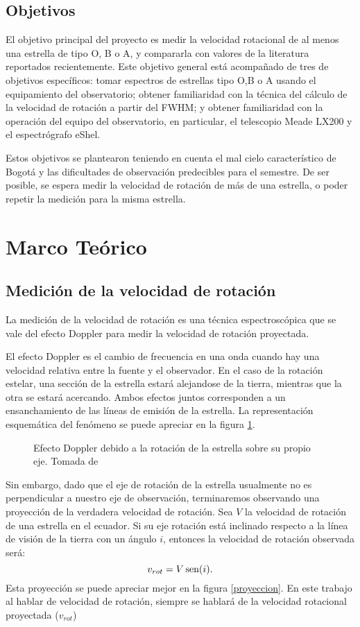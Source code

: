 \documentclass[notitlepage,letterpaper,12pt]{article} %
\def\sen{\mathop{\mbox{\normalfont sen}}\nolimits} %
\begin{document}
\subsection*{Objetivos}
El objetivo principal del proyecto es medir la velocidad rotacional de al menos una estrella de tipo O, B o A, y compararla con valores de la literatura reportados recientemente.
Este objetivo general está acompañado de tres de objetivos específicos: tomar espectros de estrellas tipo O,B o A usando el equipamiento del observatorio; obtener familiaridad con la técnica del cálculo de la velocidad de rotación a partir del FWHM; y obtener familiaridad con la operación del equipo del observatorio, en particular, el telescopio Meade LX200 y el espectrógrafo eShel.

Estos objetivos se plantearon teniendo en cuenta el mal cielo característico de Bogotá y las dificultades de observación predecibles para el semestre. De ser posible, se espera medir la velocidad de rotación de más de una estrella, o poder repetir la medición para la misma estrella.

\section{Marco Teórico}
\subsection*{Medición de la velocidad de rotación}
La medición de la velocidad de rotación es una técnica espectroscópica que se vale del efecto Doppler para medir la velocidad de rotación proyectada.

El efecto Doppler es el cambio de frecuencia en una onda cuando hay una velocidad relativa entre la fuente y el observador. En el caso de la rotación estelar, una sección de la estrella estará alejandose de la tierra, mientras que la otra se estará acercando. Ambos efectos juntos corresponden a un ensanchamiento de las líneas de emisión de la estrella.
La representación esquemática del fenómeno se puede apreciar en la figura \ref{doppler}.

\begin{figure}[h!]
  \centering
  \caption{Efecto Doppler debido a la rotación de la estrella sobre su propio eje. Tomada de \cite{doppler} }
  \label{doppler}
\end{figure}

Sin embargo, dado que el eje de rotación de la estrella usualmente no es perpendicular a nuestro eje de observación, terminaremos observando una proyección de la verdadera velocidad de rotación. Sea $V$ la velocidad de rotación de una estrella en el ecuador. Si su eje rotación está inclinado respecto a la línea de visión de la tierra con un ángulo $i$, entonces la velocidad de rotación observada será:
\begin{equation}
v_{rot} = V \sen (i).
\end{equation}
Esta proyección se puede apreciar mejor en la figura \ref{proyeccion}. En este trabajo al hablar de velocidad de rotación, siempre se hablará de la velocidad rotacional proyectada ($v_{rot}$)
\end{document}
